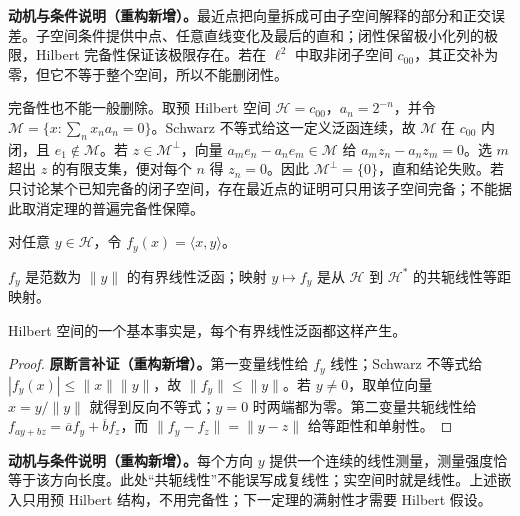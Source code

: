 \documentclass[../../main.tex]{subfiles}
\begin{document}
\begin{remark}
\textbf{动机与条件说明（重构新增）。}最近点把向量拆成可由子空间解释的部分和正交误差。子空间条件提供中点、任意直线变化及最后的直和；闭性保留极小化列的极限，Hilbert 完备性保证该极限存在。若在 $\ell^2$ 中取非闭子空间 $c_{00}$，其正交补为零，但它不等于整个空间，所以不能删闭性。

完备性也不能一般删除。取预 Hilbert 空间 $\mathscr H=c_{00}$，$a_n=2^{-n}$，并令 $\mathscr M=\{x:\sum_nx_na_n=0\}$。Schwarz 不等式给这一定义泛函连续，故 $\mathscr M$ 在 $c_{00}$ 内闭，且 $e_1\notin\mathscr M$。若 $z\in\mathscr M^\perp$，向量 $a_me_n-a_ne_m\in\mathscr M$ 给 $a_mz_n-a_nz_m=0$。选 $m$ 超出 $z$ 的有限支集，便对每个 $n$ 得 $z_n=0$。因此 $\mathscr M^\perp=\{0\}$，直和结论失败。若只讨论某个已知完备的闭子空间，存在最近点的证明可只用该子空间完备；不能据此取消定理的普遍完备性保障。
\end{remark}
对任意 $y\in\mathscr H$，令 $f_y(x)=\langle x,y\rangle$。
\begin{proposition}\label{proposition:ch05-inner-product-functional-isometry}
$f_y$ 是范数为 $\|y\|$ 的有界线性泛函；映射 $y\mapsto f_y$ 是从 $\mathscr H$ 到 $\mathscr H^*$ 的共轭线性等距映射。
\end{proposition}
Hilbert 空间的一个基本事实是，每个有界线性泛函都这样产生。
\begin{proof}
\textbf{原断言补证（重构新增）。}第一变量线性给 $f_y$ 线性；Schwarz 不等式给 $|f_y(x)|\leqslant\|x\|\|y\|$，故 $\|f_y\|\leqslant\|y\|$。若 $y\ne0$，取单位向量 $x=y/\|y\|$ 就得到反向不等式；$y=0$ 时两端都为零。第二变量共轭线性给 $f_{ay+bz}=\overline a f_y+\overline b f_z$，而 $\|f_y-f_z\|=\|y-z\|$ 给等距性和单射性。
\end{proof}
\begin{remark}
\textbf{动机与条件说明（重构新增）。}每个方向 $y$ 提供一个连续的线性测量，测量强度恰等于该方向长度。此处“共轭线性”不能误写成复线性；实空间时就是线性。上述嵌入只用预 Hilbert 结构，不用完备性；下一定理的满射性才需要 Hilbert 假设。
\end{remark}
\end{document}
